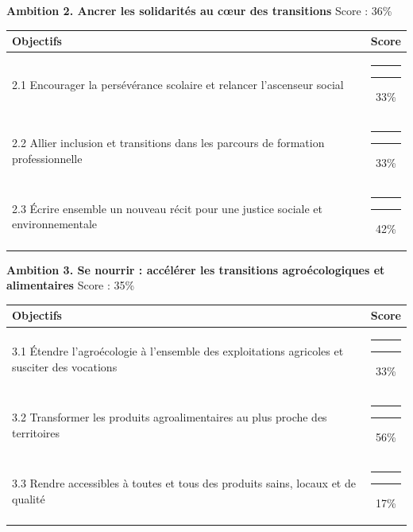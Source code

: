 \documentclass[
]{article}
\begin{document}
\needspace{8cm}
\vspace{0.8cm}

\textbf{\fontsize{10pt}{12pt}\selectfont Ambition 2. Ancrer les solidarités au cœur des transitions}
\hfill \small Score : 36\%

\begin{center}
\begin{tabular}{p{10cm}c}
\toprule
Objectifs & Score \\
\midrule
2.1 Encourager la persévérance scolaire et relancer l’ascenseur social & {\color[HTML]{EB6E26}\rule{1.98cm}{3pt}}{\color{gray}\rule{4.02cm}{3pt}}\hspace{0.3cm}33\% \\
2.2 Allier inclusion et transitions dans les parcours de formation professionnelle & {\color[HTML]{EB6E26}\rule{1.98cm}{3pt}}{\color{gray}\rule{4.02cm}{3pt}}\hspace{0.3cm}33\% \\
2.3 Écrire ensemble un nouveau récit pour une justice sociale et environnementale & {\color[HTML]{EB6E26}\rule{2.52cm}{3pt}}{\color{gray}\rule{3.48cm}{3pt}}\hspace{0.3cm}42\% \\
\bottomrule
\end{tabular}
\end{center}

\needspace{8cm}
\vspace{0.8cm}

\textbf{\fontsize{10pt}{12pt}\selectfont Ambition 3. Se nourrir : accélérer les transitions agroécologiques et alimentaires}
\hfill \small Score : 35\%

\begin{center}
\begin{tabular}{p{10cm}c}
\toprule
Objectifs & Score \\
\midrule
3.1 Étendre l’agroécologie à l’ensemble des exploitations agricoles et susciter des vocations & {\color[HTML]{EB6E26}\rule{1.98cm}{3pt}}{\color{gray}\rule{4.02cm}{3pt}}\hspace{0.3cm}33\% \\
3.2 Transformer les produits agroalimentaires au plus proche des territoires & {\color[HTML]{6E9E62}\rule{3.36cm}{3pt}}{\color{gray}\rule{2.64cm}{3pt}}\hspace{0.3cm}56\% \\
3.3 Rendre accessibles à toutes et tous des produits sains, locaux et de qualité & {\color[HTML]{CC1414}\rule{1.02cm}{3pt}}{\color{gray}\rule{4.98cm}{3pt}}\hspace{0.3cm}17\% \\
\bottomrule
\end{tabular}
\end{center}
\end{document}
